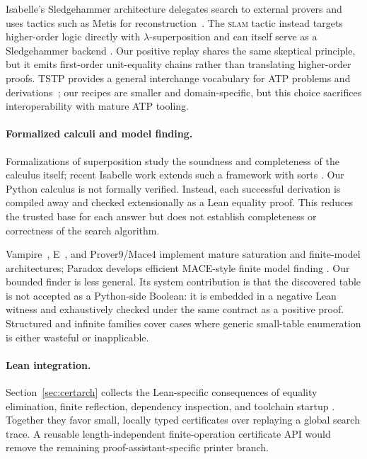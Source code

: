 \documentclass[10pt,twocolumn]{article}
\begin{document}
Isabelle's Sledgehammer architecture delegates search to external provers and
uses tactics such as Metis for reconstruction~\cite{sledgehammer,metis}.
The \textsc{slam} tactic instead targets higher-order logic directly with
$\lambda$-superposition and can itself serve as a Sledgehammer backend
\cite{slam}.  Our positive replay shares the same skeptical principle, but it
emits first-order unit-equality chains rather than translating higher-order
proofs.  TSTP provides a general interchange vocabulary for ATP problems and
derivations~\cite{tstp}; our recipes are smaller and domain-specific, but this
choice sacrifices interoperability with mature ATP tooling.

\paragraph{Formalized calculi and model finding.}
Formalizations of superposition study the soundness and completeness of the
calculus itself; recent Isabelle work extends such a framework with sorts
\cite{sortedSuperposition}.  Our Python calculus is not formally verified.
Instead, each successful derivation is compiled away and checked extensionally
as a Lean equality proof.  This reduces the trusted base for each answer but
does not establish completeness or correctness of the search algorithm.

Vampire~\cite{vampire}, E~\cite{eprover}, and Prover9/Mace4
\cite{prover9} implement mature saturation and finite-model architectures;
Paradox develops efficient MACE-style finite model finding
\cite{paradox}.  Our bounded finder is less general.  Its system contribution
is that the discovered table is not accepted as a Python-side Boolean: it is
embedded in a negative Lean witness and exhaustively checked under the same
contract as a positive proof.  Structured and infinite families cover cases
where generic small-table enumeration is either wasteful or inapplicable.

\paragraph{Lean integration.}
Section~\ref{sec:certarch} collects the Lean-specific consequences of equality
elimination, finite reflection, dependency inspection, and toolchain startup
\cite{lean4,mathlib}.  Together they favor small, locally typed certificates
over replaying a global search trace.  A reusable length-independent
finite-operation certificate API would remove the remaining
proof-assistant-specific printer branch.
\end{document}
